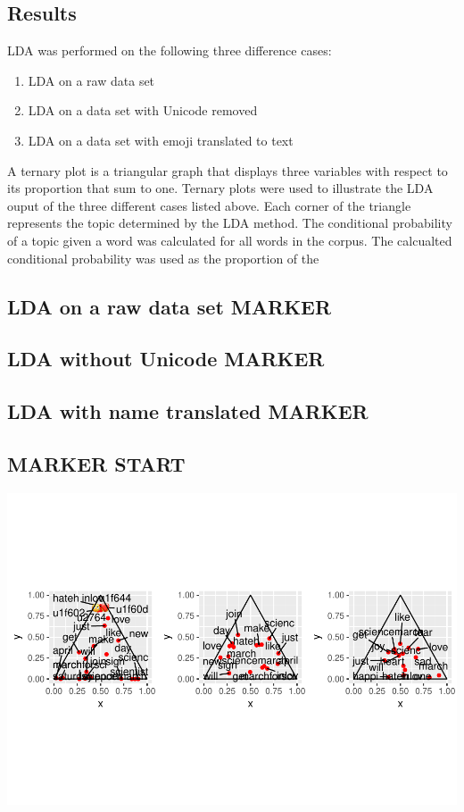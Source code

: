 \documentclass[]{article}
\begin{document}
\subsection{Results}\label{results}

LDA was performed on the following three difference cases:

\begin{enumerate}
\item LDA on a raw data set
\item LDA on a data set with Unicode removed
\item LDA on a data set with emoji translated to text
\end{enumerate}

A ternary plot is a triangular graph that displays three variables with
respect to its proportion that sum to one. Ternary plots were used to
illustrate the LDA ouput of the three different cases listed above. Each
corner of the triangle represents the topic determined by the LDA
method. The conditional probability of a topic given a word was
calculated for all words in the corpus. The calcualted conditional
probability was used as the proportion of the

\subsection{LDA on a raw data set
MARKER}\label{lda-on-a-raw-data-set-marker}

\subsection{LDA without Unicode
MARKER}\label{lda-without-unicode-marker}

\subsection{LDA with name translated
MARKER}\label{lda-with-name-translated-marker}

\subsection{MARKER START}\label{marker-start}

\includegraphics{CC_paper_files/figure-latex/unnamed-chunk-3-1.pdf}
\end{document}
